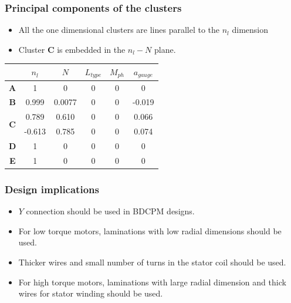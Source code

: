 \documentclass[svgnames, table, smaller]{beamer}
\begin{document}
\begin{frame}
  \frametitle{Principal components of the clusters}
  \begin{itemize}
  \item All the one dimensional clusters are lines parallel to the $n_l$ dimension
  \item Cluster \textbf{C} is embedded in the $n_l-N$ plane.
  \end{itemize}

  \begin{table}[!ht]
    \centering
    \begin{tabular}{c|c|c|c|c|c|}
      
      \cline{2-6}
      & $n_l$ & $N$ & $ L_{type} $  & $ M_{ph}$ & $a_{gauge}$ \\
      \hline
      \multicolumn{1}{|c|}{\textbf{A}} & 1 & 0 & 0 & 0 & 0 \\
      \hline
      \multicolumn{1}{|c|}{\textbf{B}} & 0.999 & 0.0077 & 0 & 0 & -0.019\\
      \hline
      \multicolumn{1}{|c|}{\multirow{2}{*}{\textbf{C}}} & 0.789 & 0.610 & 0 & 0 & 0.066\\ \cline{2-6}
      \multicolumn{1}{|c|}{}& -0.613 & 0.785 & 0 & 0 & 0.074\\
      \hline
      \multicolumn{1}{|c|}{\textbf{D}} & 1 & 0 & 0 & 0 & 0\\
      \hline
      \multicolumn{1}{|c|}{\textbf{E}} & 1 & 0 & 0 & 0 & 0\\
      \hline
    \end{tabular}
    \label{clusterPC}
  \end{table}
\end{frame}


\begin{frame}
  \frametitle{Design implications}
  
  \begin{itemize}
    \item $Y$ connection should be used in BDCPM designs.
    \item For low torque motors, laminations with low radial dimensions
      should be used.
    \item Thicker wires and small number of turns in the stator coil should
      be used.
    \item For high torque motors, laminations with large radial dimension
      and thick wires for stator winding should be used.
    
  \end{itemize}

\end{frame}
\end{document}
